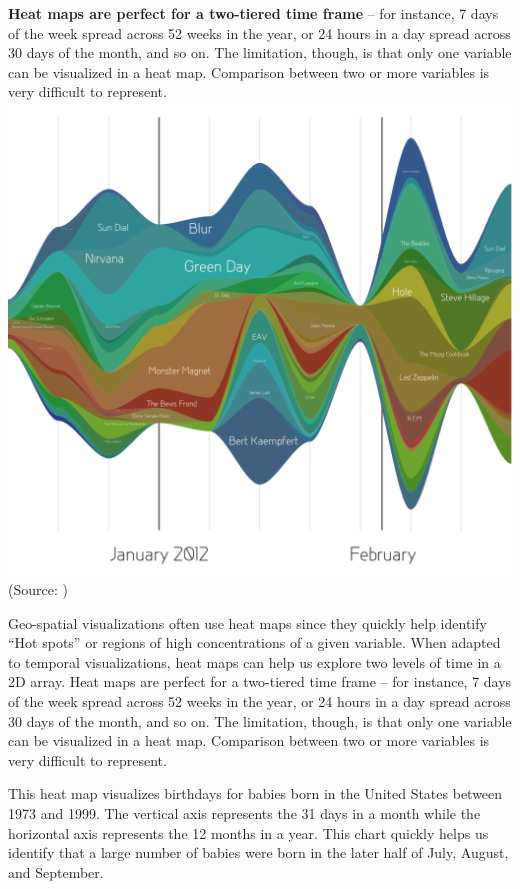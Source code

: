 \documentclass[]{book}
\theoremstyle{definition}
\theoremstyle{definition}
\theoremstyle{definition}
\theoremstyle{remark}
\begin{document}
\textbf{Heat maps are perfect for a two-tiered time frame} -- for
instance, 7 days of the week spread across 52 weeks in the year, or 24
hours in a day spread across 30 days of the month, and so on. The
limitation, though, is that only one variable can be visualized in a
heat map. Comparison between two or more variables is very difficult to
represent. \includegraphics{images/aya-stream.png} (Source:
\citep{aya-time-series})

Geo-spatial visualizations often use heat maps since they quickly help
identify ``Hot spots'' or regions of high concentrations of a given
variable. When adapted to temporal visualizations, heat maps can help us
explore two levels of time in a 2D array. Heat maps are perfect for a
two-tiered time frame -- for instance, 7 days of the week spread across
52 weeks in the year, or 24 hours in a day spread across 30 days of the
month, and so on. The limitation, though, is that only one variable can
be visualized in a heat map. Comparison between two or more variables is
very difficult to represent.

This heat map visualizes birthdays for babies born in the United States
between 1973 and 1999. The vertical axis represents the 31 days in a
month while the horizontal axis represents the 12 months in a year. This
chart quickly helps us identify that a large number of babies were born
in the later half of July, August, and September.
\end{document}
